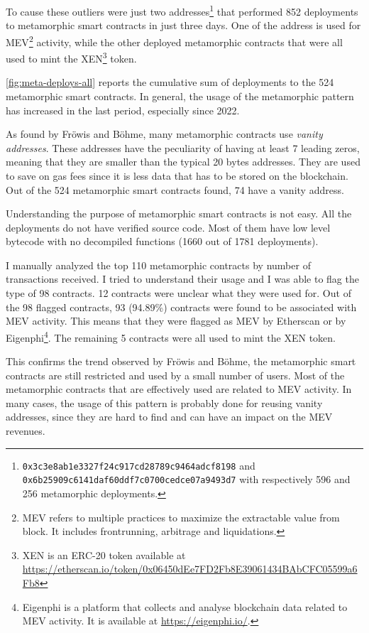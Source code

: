 To cause these outliers were just two addresses\footnote{{\tt 0x3c3e8ab1e3327f24c917cd28789c9464adcf8198} and \\{\tt 0x6b25909c6141daf60ddf7c0700cedce07a9493d7} with respectively 596 and 256 metamorphic deployments.} that performed 852 deployments to metamorphic smart contracts in just three days. One of the address is used for MEV\footnote{MEV refers to multiple practices to maximize the extractable value from block. It includes frontrunning, arbitrage and liquidations.} activity, while the other deployed metamorphic contracts that were all used to mint the XEN\footnote{XEN is an ERC-20 token available at \url{https://etherscan.io/token/0x06450dEe7FD2Fb8E39061434BAbCFC05599a6Fb8}} token.

\cref{fig:meta-deploys-all} reports the cumulative sum of deployments to the 524 metamorphic smart contracts. In general, the usage of the metamorphic pattern has increased in the last period, especially since 2022.

As found by Fröwis and Böhme, many metamorphic contracts use \textit{vanity addresses}. These addresses have the peculiarity of having at least 7 leading zeros, meaning that they are smaller than the typical 20 bytes addresses. They are used to save on gas fees since it is less data that has to be stored on the blockchain. Out of the 524 metamorphic smart contracts found, 74 have a vanity address.

Understanding the purpose of metamorphic smart contracts is not easy. All the deployments do not have verified source code. Most of them have low level bytecode with no decompiled functions (1660 out of 1781 deployments). 

I manually analyzed the top 110 metamorphic contracts by number of transactions received. I tried to understand their usage and I was able to flag the type of 98 contracts. 12 contracts were unclear what they were used for. Out of the 98 flagged contracts, 93 (94.89\%) contracts were found to be associated with MEV activity. This means that they were flagged as MEV by Etherscan or by Eigenphi\footnote{Eigenphi is a platform that collects and analyse blockchain data related to MEV activity. It is available at \url{https://eigenphi.io/}.}. The remaining 5 contracts were all used to mint the XEN token. 

This confirms the trend observed by Fröwis and Böhme, the metamorphic smart contracts are still restricted and used by a small number of users. Most of the metamorphic contracts that are effectively used are related to MEV activity. In many cases, the usage of this pattern is probably done for reusing vanity addresses, since they are hard to find and can have an impact on the MEV revenues.

